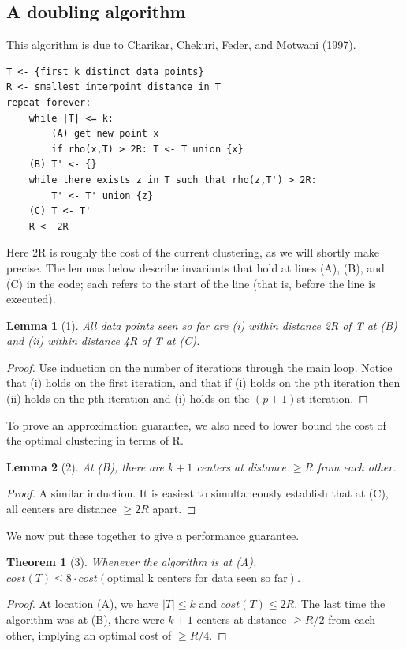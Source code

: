 \documentclass[letterpaper,10pt]{article}
\theoremstyle{plain}
\newtheorem{lemma}{Lemma}
\newtheorem{theorem}{Theorem}
\begin{document}
\subsection{A doubling algorithm}
This algorithm is due to Charikar, Chekuri, Feder, and Motwani (1997). 
\begin{verbatim}
T <- {first k distinct data points}
R <- smallest interpoint distance in T
repeat forever:
    while |T| <= k:
        (A) get new point x
        if rho(x,T) > 2R: T <- T union {x}
    (B) T' <- {}
    while there exists z in T such that rho(z,T') > 2R:
        T' <- T' union {z}
    (C) T <- T'
    R <- 2R
\end{verbatim}
Here 2R is roughly the cost of the current clustering, as we will shortly make precise.  The lemmas below describe invariants that hold at lines (A), (B), and (C) in the code;  each refers to the start of the line (that is, before the line is executed). 

\begin{lemma}[1]
All data points seen so far are (i) within distance 2R of T at (B) and (ii) within distance 4R of T at (C). 
\end{lemma}
\begin{proof}
Use induction on the number of iterations through the main loop.  Notice that (i) holds on the first iteration, and that if (i) holds on the pth iteration then (ii) holds on the pth iteration and (i) holds on the $(p+1)$st iteration. 
\end{proof}
To prove an approximation guarantee, we also need to lower bound the cost of the optimal clustering in terms of R. 

\begin{lemma}[2]
At (B), there are $k+1$ centers at distance $\ge R$ from each other. 
\end{lemma}
\begin{proof}
A similar induction.  It is easiest to simultaneously establish that at (C), all centers are distance $\ge2R$ apart. 
\end{proof}
We now put these together to give a performance guarantee. 

\begin{theorem}[3]
Whenever the algorithm is at (A),
$cost(T) \le 8 \cdot cost(\text{optimal k centers for data seen so far})$. 
\end{theorem}
\begin{proof}
At location (A), we have $|T|\le k$ and $cost(T)\le2R.$  The last time the algorithm was at (B), there were $k+1$ centers at distance $\ge R/2$ from each other, implying an optimal cost of $\ge R/4.$ 
\end{proof}
\end{document}
